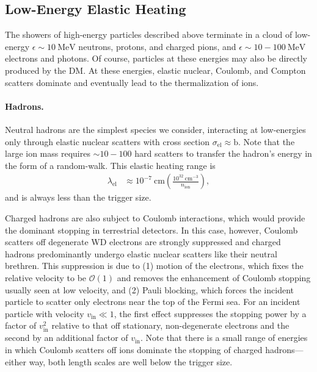 \documentclass[preprintnumbers,amsmath,amssymb,prd,superscriptaddress]{revtex4}
\newcommand{\OO}{\mathcal{O}}
\newcommand{\MeV}{\text{MeV}}
\newcommand{\x}[1]{\ensuremath{\text{#1}}} %
\def\r{\right)}
\def\l{\left(}
\begin{document}
\subsection{Low-Energy Elastic Heating}
The showers of high-energy particles described above terminate in a cloud of low-energy $\epsilon \sim 10~\MeV$ neutrons, protons, and charged pions, and $\epsilon \sim 10-100~\MeV$ electrons and photons.
Of course, particles at these energies may also be directly produced by the DM.
At these energies, elastic nuclear, Coulomb, and Compton scatters dominate and eventually lead to the thermalization of ions.

\paragraph{Hadrons.}
Neutral hadrons are the simplest species we consider, interacting at low-energies only through elastic nuclear scatters with cross section $\sigma_\text{el} \approx \text{b}$.
Note that the large ion mass requires $\sim 10 - 100$ hard scatters to transfer the hadron's energy in the form of a random-walk.
This elastic heating range is
\begin{align}
 \lambda_\text{el} &\approx
 10^{-7} ~\text{cm} \l\frac{10^{32}~\text{cm}^{-3}}{n_\text{ion}}\r,
\end{align}
and is always less than the trigger size.

Charged hadrons are also subject to Coulomb interactions, which would provide the dominant stopping in terrestrial detectors.
In this case, however, Coulomb scatters off degenerate WD electrons are strongly suppressed and charged hadrons predominantly undergo elastic nuclear scatters like their neutral brethren.
This suppression is due to (1) motion of the electrons, which fixes the relative velocity to be $\OO(1)$ and removes the enhancement of Coulomb stopping usually seen at low velocity, and (2) Pauli blocking, which forces the incident particle to scatter only electrons near the top of the Fermi sea.
For an incident particle with velocity $v_\x{in} \ll 1$, the first effect suppresses the stopping power by a factor of $v_\x{in}^2$ relative to that off stationary, non-degenerate electrons and the second by an additional factor of $v_\x{in}$.
Note that there is a small range of energies in which Coulomb scatters off ions dominate the stopping of charged hadrons---either way, both length scales are well below the trigger size.
\end{document}
